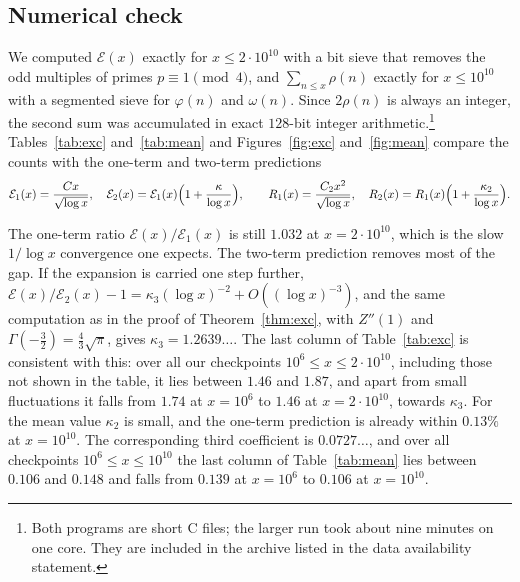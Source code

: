 \documentclass[11pt]{article}
\theoremstyle{definition}
\newcommand{\E}{\mathcal{E}}
\renewcommand{\phi}{\varphi}
\begin{document}
\subsection{Numerical check}\label{sec:numerics}

We computed $\E(x)$ exactly for $x\le2\cdot10^{10}$ with a bit sieve that removes the odd multiples of primes $p\equiv1\pmod4$, and $\sum_{n\le x}\rho(n)$ exactly for $x\le10^{10}$ with a segmented sieve for $\phi(n)$ and $\omega(n)$. Since $2\rho(n)$ is always an integer, the second sum was accumulated in exact $128$-bit integer arithmetic.\footnote{Both programs are short C files; the larger run took about nine minutes on one core. They are included in the archive listed in the data availability statement.} Tables~\ref{tab:exc} and~\ref{tab:mean} and Figures~\ref{fig:exc} and~\ref{fig:mean} compare the counts with the one-term and two-term predictions
\[
  \E_1(x)=\frac{Cx}{\sqrt{\log x}},\quad \E_2(x)=\E_1(x)\Bigl(1+\frac{\kappa}{\log x}\Bigr),\qquad
  R_1(x)=\frac{C_2x^2}{\sqrt{\log x}},\quad R_2(x)=R_1(x)\Bigl(1+\frac{\kappa_2}{\log x}\Bigr).
\]

The one-term ratio $\E(x)/\E_1(x)$ is still $1.032$ at $x=2\cdot10^{10}$, which is the slow $1/\log x$ convergence one expects. The two-term prediction removes most of the gap. If the expansion is carried one step further, $\E(x)/\E_2(x)-1=\kappa_3(\log x)^{-2}+O((\log x)^{-3})$, and the same computation as in the proof of Theorem~\ref{thm:exc}, with $Z''(1)$ and $\Gamma(-\tfrac32)=\tfrac43\sqrt\pi$, gives $\kappa_3=1.2639\ldots$. The last column of Table~\ref{tab:exc} is consistent with this: over all our checkpoints $10^6\le x\le2\cdot10^{10}$, including those not shown in the table, it lies between $1.46$ and $1.87$, and apart from small fluctuations it falls from $1.74$ at $x=10^6$ to $1.46$ at $x=2\cdot10^{10}$, towards $\kappa_3$. For the mean value $\kappa_2$ is small, and the one-term prediction is already within $0.13\%$ at $x=10^{10}$. The corresponding third coefficient is $0.0727\ldots$, and over all checkpoints $10^6\le x\le10^{10}$ the last column of Table~\ref{tab:mean} lies between $0.106$ and $0.148$ and falls from $0.139$ at $x=10^6$ to $0.106$ at $x=10^{10}$.
\end{document}

